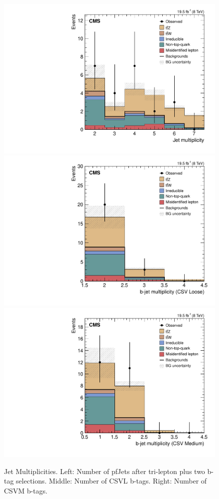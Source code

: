 \begin{figure}[h]
\begin{center}
\includegraphics[width=0.48\linewidth]{Figs/Plots_PreSelections/hNJets_3L2b.pdf}
\includegraphics[width=0.48\linewidth]{Figs/Plots_PreSelections/hNLoose_3L2b.pdf}
\includegraphics[width=0.48\linewidth]{Figs/Plots_PreSelections/hNMedium_3L2b.pdf}
\caption{\label{fig:jetmult_3L2b}
Jet Multiplicities. Left: Number of pfJets after tri-lepton plus two b-tag selections. Middle: Number of CSVL b-tags. Right: Number of CSVM b-tags.
}
\end{center}
\end{figure}



